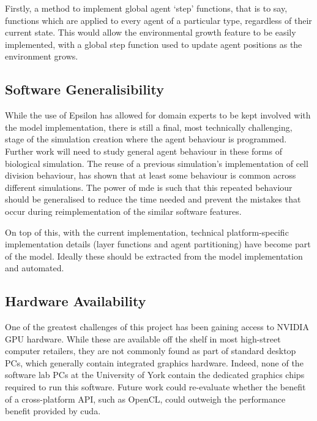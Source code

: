 \documentclass{UoYCSproject}
\begin{document}
Firstly, a method to implement global agent `step' functions, that is to say, functions which are applied to every agent of a particular type, regardless of their current state.
This would allow the environmental growth feature to be easily implemented, with a global step function used to update agent positions as the environment grows.



\subsection{Software Generalisibility}%
While the use of Epsilon has allowed for domain experts to be kept involved with the model implementation, there is still a final, most technically challenging, stage of the simulation creation where the agent behaviour is programmed.
Further work will need to study general agent behaviour in these forms of biological simulation.
The reuse of a previous simulation's implementation of cell division behaviour, has shown that at least some behaviour is common across different simulations.
The power of \gls{mde} is such that this repeated behaviour should be generalised to reduce the time needed and prevent the mistakes that occur during reimplementation of the similar software features.

On top of this, with the current implementation, technical platform-specific implementation details (layer functions and agent partitioning) have become part of the model.
Ideally these should be extracted from the model implementation and automated.

\subsection{Hardware Availability}
One of the greatest challenges of this project has been gaining access to NVIDIA GPU hardware.
While these are available off the shelf in most high-street computer retailers, they are not commonly found as part of standard desktop PCs, which generally contain integrated graphics hardware.
Indeed, none of the software lab PCs at the University of York contain the dedicated graphics chips required to run this software.
Future work could re-evaluate whether the benefit of a cross-platform API, such as OpenCL, could outweigh the performance benefit provided by \acrshort{cuda}.
\end{document}
